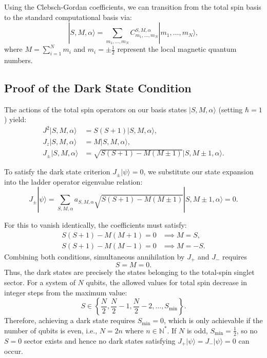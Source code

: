 \documentclass[aps,superscriptaddress,twocolumn,pre,longbibliography,floatfix]{revtex4-1}
\begin{document}
	Using the Clebsch-Gordan coefficients, we can transition from the total spin basis to the standard computational basis via:
	\begin{equation}
		|S,M,\alpha\rangle = \sum_{m_1, \dots, m_N} C_{m_1, \dots, m_N}^{S,M,\alpha} |m_1, \dots, m_N\rangle,
	\end{equation}
	where $M = \sum_{i=1}^{N} m_i$ and $m_i = \pm \frac{1}{2}$ represent the local magnetic quantum numbers.
	\subsection{Proof of the Dark State Condition}
	
	The actions of the total spin operators on our basis states $|S,M,\alpha\rangle$ (setting $\hbar = 1$) yield:
	\begin{align}
		J^2 |S,M,\alpha\rangle &= S(S+1)|S,M,\alpha\rangle, \\
		J_z |S,M,\alpha\rangle &= M|S,M,\alpha\rangle, \\
		J_{\pm} |S,M,\alpha\rangle &= \sqrt{S(S+1) - M(M \pm 1)} |S, M \pm 1, \alpha\rangle.
	\end{align}
	
	To satisfy the dark state criterion $J_{\pm}|\psi\rangle = 0$, we substitute our state expansion into the ladder operator eigenvalue relation:
	\begin{equation}
		J_{\pm}|\psi\rangle = \sum_{S,M,\alpha} a_{S,M,\alpha} \sqrt{S(S+1) - M(M \pm 1)} |S, M \pm 1, \alpha\rangle = 0.
	\end{equation}
	
	For this to vanish identically, the coefficients must satisfy:
	\begin{align}
		S(S+1) - M(M+1) = 0 &\implies M = S, \\
		S(S+1) - M(M-1) = 0 &\implies M = -S.
	\end{align}
	Combining both conditions, simultaneous annihilation by $J_+$ and $J_-$ requires
	\begin{equation}\label{SM}
		S = M = 0.
	\end{equation}
	Thus, the dark states are precisely the states belonging to the total-spin singlet sector.
	For a system of $N$ qubits, the allowed values for total spin decrease in integer steps from the maximum value:
	\begin{equation}
		S \in \left\{ \frac{N}{2}, \frac{N}{2}-1, \frac{N}{2}-2, \dots, S_{\min} \right\}.
	\end{equation}
	Therefore, achieving a dark state requires $S_{\min} = 0$, which is only achievable if the number of qubits is even, i.e., $N = 2n$ where $n \in \mathbb{N}^*$. If $N$ is odd, $S_{\min} = \frac{1}{2}$, so no $S = 0$ sector exists and hence no dark states satisfying $J_+ |\psi\rangle = J_- |\psi\rangle = 0$ can occur.		
\end{document}
